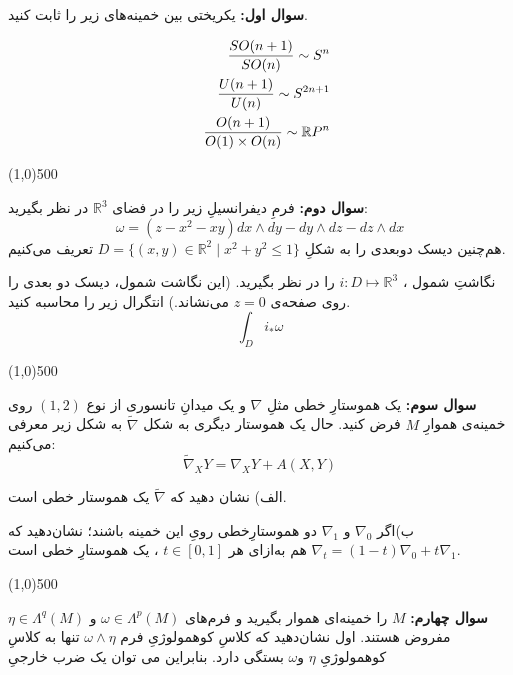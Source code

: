 \documentclass{article}
\begin{document}
\textbf{سوال اول:}   یکریختی
بین خمینه‌های زیر را ثابت کنید.

\begin{eqnarray}
	&&	\frac{{SO}(n+1)}{{SO}(n)} \sim S^n\cr
	&&	\frac{U(n+1)}{U(n)}  \sim S^{2n+1}\cr
	&&	\frac{O(n+1)}{O(1)\times O(n)}	\sim {\mathbb{R}}{P}^n
\end{eqnarray}
\vspace{-5em}


 {\color{cyan}
	\begin{center} \linethickness{1mm}\line(1,0){500} \end{center}
}

\textbf{سوال دوم:} 
فرمِ دیفرانسیلِ زیر را در فضای 
$\mathbb{R}^3$
در نظر بگیرید:
\[
	\omega = (z-x^2-xy) {d}x\wedge{d}y - {d}y\wedge{d}z - {d}z\wedge {d}x
\]
هم‌چنین دیسک دوبعدی را به شکلِ 
$
	D = \{(x,y) \in \mathbb{R}^2 \;|\; x^2 + y^2 \leq 1\} 
$
تعریف می‌کنیم.

 نگاشتِ شمول
،
$i:D\longmapsto \mathbb{R}^3$
را در نظر بگیرید. (این نگاشت شمول، دیسک دو بعدی را روی صفحه‌ی 
$z=0$
می‌نشاند.) {انتگرال زیر را محاسبه کنید.}
\[
	\int_{D}^{} i_*\omega
\]

\vspace{-3.5em}
 {\color{cyan}
	\begin{center} \linethickness{1mm}\line(1,0){500} \end{center}
}


\textbf{سوال سوم:}  یک هموستارِ  
خطی
 مثلِ
$\nabla$
و یک میدانِ تانسوری از نوع 
$(1,2)$
روی خمینه‌ی هموارِ
$M$ 
 فرض کنید. حال یک هموستار دیگری به شکل 
$\tilde{\nabla}$
 به شکل زیر معرفی می‌کنیم:
\[
\tilde{\nabla}_XY = \nabla_XY +A(X,Y)
\]

	الف) نشان دهید که 
	$\tilde{\nabla}$
	یک هموستار خطی است.
	
	ب)اگر 
	$\nabla_0$
	 و
	 $\nabla_1$
	 دو هموستارِخطی رویِ این خمینه باشند؛ نشان‌دهید که 
	 $
	 \nabla_t = (1-t)\nabla_0 + t\nabla_1
	 $
	 هم به‌ازای هر 
	 $t\in [0,1]$
	 ، یک هموستارِ خطی است.

\vspace{-1em}


{\color{cyan}
	\begin{center} \linethickness{1mm}\line(1,0){500} \end{center}
}
\textbf{سوال چهارم: }
	$M$ را خمینه‌ای هموار بگیرید و
فرم‌های 
$\omega \in \Lambda^p(M)$
و
$\eta \in \Lambda^q(M)$
مفروض هستند.
اول نشان‌دهید که کلاسِ کوهمولوژیِ فرم 
$\omega \wedge \eta$
تنها به کلاسِ کوهمولوژیِ 
$\eta$ و‌$\omega$
بستگی دارد.  بنابراین  می توان یک ضرب خارجیِ
  
\end{document}
